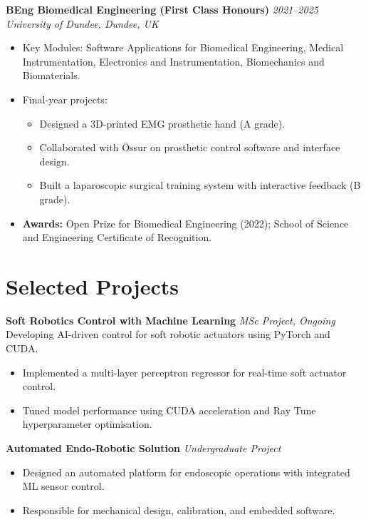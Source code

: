 \documentclass[a4paper,11pt]{article}
\begin{document}
\textbf{BEng Biomedical Engineering (First Class Honours)} \hfill \textit{2021–2025}\\
\textit{University of Dundee, Dundee, UK}
\begin{itemize}
    \item Key Modules: Software Applications for Biomedical Engineering, Medical Instrumentation, Electronics and Instrumentation, Biomechanics and Biomaterials.
    \item Final-year projects:
        \begin{itemize}
            \item Designed a 3D-printed EMG prosthetic hand (A grade).
            \item Collaborated with Össur on prosthetic control software and interface design.
            \item Built a laparoscopic surgical training system with interactive feedback (B grade).
        \end{itemize}
    \item \textbf{Awards:} Open Prize for Biomedical Engineering (2022); School of Science and Engineering Certificate of Recognition.
\end{itemize}

\section*{Selected Projects}

\textbf{Soft Robotics Control with Machine Learning} \hfill \textit{MSc Project, Ongoing}\\
Developing AI-driven control for soft robotic actuators using PyTorch and CUDA.
\begin{itemize}
    \item Implemented a multi-layer perceptron regressor for real-time soft actuator control.
    \item Tuned model performance using CUDA acceleration and Ray Tune hyperparameter optimisation.
\end{itemize}

\textbf{Automated Endo-Robotic Solution} \hfill \textit{Undergraduate Project}\\
\begin{itemize}
    \item Designed an automated platform for endoscopic operations with integrated ML sensor control.
    \item Responsible for mechanical design, calibration, and embedded software.
\end{itemize}
\end{document}
